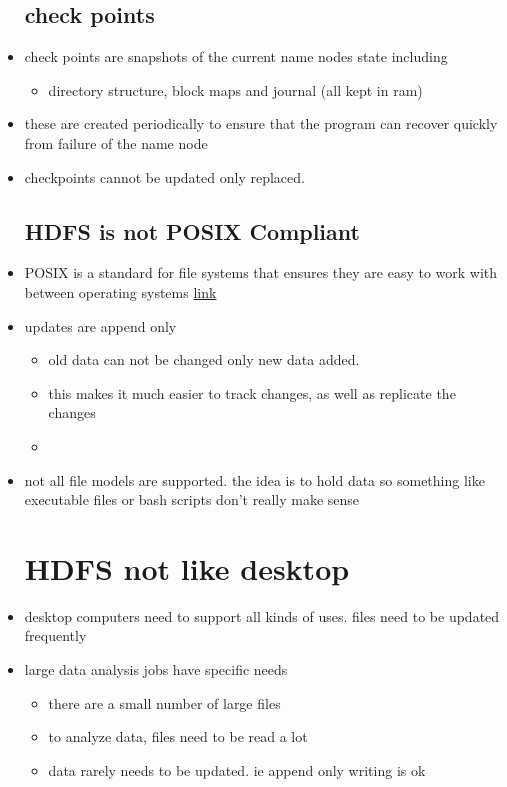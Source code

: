 \documentclass{article}
\begin{document}
\begin{itemize}
\subsection{check points}
\item check points are snapshots of the current name nodes state including 
\begin{itemize}
    \item directory structure, block maps and journal (all kept in ram)
\end{itemize}
\item these are created periodically to ensure that the program can recover quickly from failure of the name node 
\item checkpoints cannot be updated only replaced. 
\subsection{HDFS is not POSIX Compliant}
\item POSIX is a standard for file systems that ensures they are easy to work with between operating systems \href{https://en.wikipedia.org/wiki/POSIX}{link}
\item updates are append only 
\begin{itemize}
    \item old data can not be changed only new data added.
    \item this makes it much easier to track changes, as well as replicate the changes
    \item 
\end{itemize}
\item not all file models are supported. the idea is to hold data so something like executable files or bash scripts don't really make sense
\section{HDFS not like desktop}
\item desktop computers need to support all kinds of uses. files need to be updated frequently 
\item large data analysis jobs have specific needs
\begin{itemize}
    \item there are a small number of large files
    \item to analyze data, files need to be read a lot 
    \item data rarely needs to be updated. ie append only writing is ok
\end{itemize}

\end{itemize}
\end{document}
